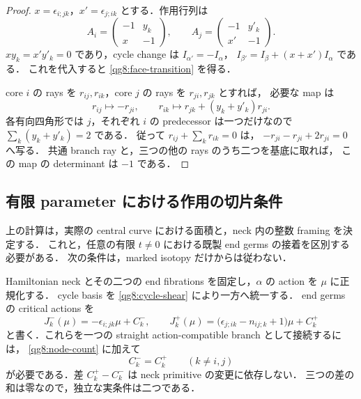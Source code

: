 \begin{proof}
$x=\epsilon_{i;jk}$，$x'=\epsilon_{j;ik}$ とする．作用行列は
\[
 A_i=\begin{pmatrix}-1&y_k\\x&-1\end{pmatrix},\qquad
 A_j=\begin{pmatrix}-1&y'_k\\x'&-1\end{pmatrix}.
\]
$xy_k=x'y'_k=0$ であり，cycle change は
$I_{\alpha'}=-I_\alpha$，
$I_{\beta'}=I_\beta+(x+x')I_\alpha$ である．
これを代入すると \eqref{qg8:face-transition} を得る．

core $i$ の rays を $r_{ij},r_{ik}$，core $j$ の rays を $r_{ji},r_{jk}$ とすれば，
必要な map は
\[
 r_{ij}\longmapsto-r_{ji},\qquad
 r_{ik}\longmapsto r_{jk}+(y_k+y'_k)r_{ji}.
\]
各有向四角形では $j$，それぞれ $i$ の predecessor は一つだけなので
$\sum_k(y_k+y'_k)=2$ である．
従って $r_{ij}+\sum_kr_{ik}=0$ は，
$-r_{ji}-r_{ji}+2r_{ji}=0$ へ写る．
共通 branch ray と，三つの他の rays のうち二つを基底に取れば，
この map の determinant は $-1$ である．
\end{proof}

\subsection{有限 parameter における作用の切片条件}

上の計算は，実際の central curve における面積と，neck 内の整数 framing を決定する．
これと，任意の有限 $t\ne0$ における既製 end germs の接着を区別する必要がある．
次の条件は，marked isotopy だけからは従わない．

\begin{lemma}\label{qg8:intercept}
Hamiltonian neck とその二つの end fibrations を固定し，$\alpha$ の action を $\mu$ に正規化する．
cycle basis を \eqref{qg8:cycle-shear} により一方へ統一する．
end germs の critical actions を
\[
 J^-_k(\mu)=-\epsilon_{i;jk}\mu+C^-_k,\qquad
 J^+_k(\mu)=\bigl(\epsilon_{j;ik}-n_{ij;k}+1\bigr)\mu+C^+_k
\]
と書く．これらを一つの straight action-compatible branch として接続するには，
\eqref{qg8:node-count} に加えて
\begin{equation}\label{qg8:intercept-equality}
 C^-_k=C^+_k\qquad(k\ne i,j)
\end{equation}
が必要である．差 $C^+_k-C^-_k$ は neck primitive の変更に依存しない．
三つの差の和は零なので，独立な実条件は二つである．
\end{lemma}


